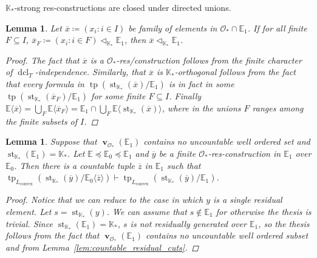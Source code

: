 \documentclass{amsart}
\newtheorem{lemma}[theorem]{Lemma}
\theoremstyle{remark}
\theoremstyle{definition}
\theoremstyle{plain}
\newcommand{\bE}{\mathbb E}
\newcommand{\bK}{\mathbb K}
\newcommand{\cO}{\mathcal O}
\newcommand{\convex}{\mathrm{convex}}
\DeclareMathOperator{\val}{\mathbf{v}}
\DeclareMathOperator{\std}{\mathrm{st}}
\DeclareMathOperator{\tp}{\mathrm{tp}}
\DeclareMathOperator{\dcl}{\mathrm{dcl}}
\theoremstyle{plain}
\begin{document}
$\bK_*$-strong res-constructions are closed under directed unions.

\begin{lemma}\label{lem:strong_dir_unions}
    Let $\overline{x}\coloneqq (x_i : i \in I)$ be family of elements in $\cO_* \cap \bE_1$. If for all finite $F \subseteq I$, $\overline{x}_{F}\coloneqq (x_i : i\in F)\triangleleft_{\bK_*}\bE_1$, then $\overline{x} \triangleleft_{\bK_*} \bE_1$.
    \begin{proof}
        The fact that $\overline{x}$ is a $\cO_*$-res/construction follows from the finite character of $\dcl_T$-independence. Similarly, that $\overline{x}$ is $\bK_*$-orthogonal follows from the fact that every formula in $\tp(\std_{\bK_*}(\overline{x})/\bE_1)$ is in fact in some $\tp(\std_{\bK_*}(\overline{x}_{F})/\bE_1)$ for some finite $F \subseteq I$.
        Finally $\bE \langle \overline{x} \rangle = \bigcup_{F} \bE \langle \overline{x}_F \rangle = \bE_1 \cap \bigcup_{F} \bE \langle \std_{\bK_*}(\overline{x})\rangle$, where in the unions $F$ ranges among the finite subsets of $I$.
    \end{proof}
\end{lemma}

\begin{lemma}
    Suppose that $\val_{\cO_*}(\bE_1)$ contains no uncountable well ordered set and $\std_{\bK_*}(\bE_1)=\bK_*$. Let $\bE \preceq \bE_0 \preceq \bE_1$ and $\overline{y}$ be a finite $\cO_*$-res-construction in $\bE_1$ over $\bE_0$.
    Then there is a countable tuple $\overline{z}$ in $\bE_1$ such that $\tp_{L_{\convex}}(\std_{\bK_*}(\overline{y})/\bE_0\langle \overline{z} \rangle) \vdash \tp_{L_{\convex}}(\std_{\bK_*}(\overline{y})/\bE_1)$.
    \begin{proof}
        Notice that we can reduce to the case in which $y$ is a single residual element.
        Let $s=\std_{\bK_*}(y)$. We can assume that $s \notin \bE_1$ for otherwise the thesis is trivial. 
        Since $\std_{\bK_*}(\bE_1)=\bK_*$, $s$ is not residually generated over $\bE_1$, so the thesis follows from the fact that $\val_{\cO_*}(\bE_1)$ contains no uncountable well ordered subset and from Lemma~\ref{lem:countable_residual_cuts}.
    \end{proof}
\end{lemma}
\end{document}
